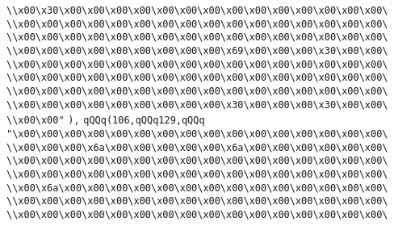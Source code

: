 \verb|\\x00\x30\x00\x00\x00\x00\x00\x00\x00\x00\x00\x00\x00\x00\x00\x00\|\newline
\verb|\\x00\x00\x00\x00\x00\x00\x00\x00\x00\x00\x00\x00\x00\x00\x00\x00\|\newline
\verb|\\x00\x00\x00\x00\x00\x00\x00\x00\x00\x00\x00\x00\x00\x00\x00\x00\|\newline
\verb|\\x00\x00\x00\x00\x00\x00\x00\x00\x00\x69\x00\x00\x00\x30\x00\x00\|\newline
\verb|\\x00\x00\x00\x00\x00\x00\x00\x00\x00\x00\x00\x00\x00\x00\x00\x00\|\newline
\verb|\\x00\x00\x00\x00\x00\x00\x00\x00\x00\x00\x00\x00\x00\x00\x00\x00\|\newline
\verb|\\x00\x00\x00\x00\x00\x00\x00\x00\x00\x00\x00\x00\x00\x00\x00\x00\|\newline
\verb|\\x00\x00\x00\x00\x00\x00\x00\x00\x00\x30\x00\x00\x00\x30\x00\x00\|\newline
\verb|\\x00\x00"|\newline
\verb|),|\newline
\verb|qQQq(106,qQQq129,qQQq|\newline
\verb|"\x00\x00\x00\x00\x00\x00\x00\x00\x00\x00\x00\x00\x00\x00\x00\x00\|\newline
\verb|\\x00\x00\x00\x6a\x00\x00\x00\x00\x00\x6a\x00\x00\x00\x00\x00\x00\|\newline
\verb|\\x00\x00\x00\x00\x00\x00\x00\x00\x00\x00\x00\x00\x00\x00\x00\x00\|\newline
\verb|\\x00\x00\x00\x00\x00\x00\x00\x00\x00\x00\x00\x00\x00\x00\x00\x00\|\newline
\verb|\\x00\x6a\x00\x00\x00\x00\x00\x00\x00\x00\x00\x00\x00\x00\x00\x00\|\newline
\verb|\\x00\x00\x00\x00\x00\x00\x00\x00\x00\x00\x00\x00\x00\x00\x00\x00\|\newline
\verb|\\x00\x00\x00\x00\x00\x00\x00\x00\x00\x00\x00\x00\x00\x00\x00\x00\|\newline
